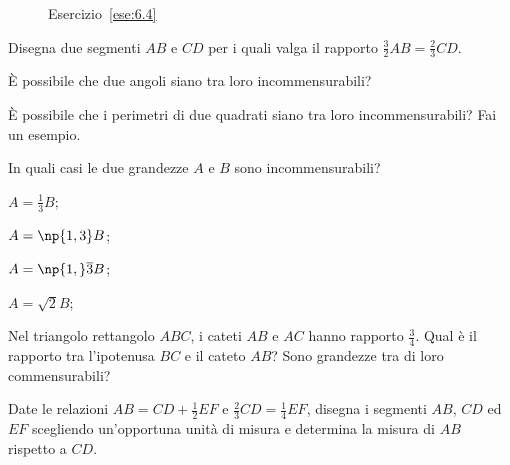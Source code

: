 \begin{inaccessibleblock}
 \begin{figure}[!htb]
	\centering
	\caption{Esercizio~\ref{ese:6.4}}\label{fig:ese6.4}
\end{figure}
\end{inaccessibleblock}

\begin{esercizio}
\label{ese:6.5}
Disegna due segmenti \(AB\) e \(CD\) per i quali valga il rapporto 
\(\frac{3}{2}AB=\frac{2}{3}CD\).
\end{esercizio}

\begin{esercizio}
\label{ese:6.6}
\`E possibile che due angoli siano tra loro incommensurabili?
\end{esercizio}

\begin{esercizio}
\label{ese:6.7}
\`E possibile che i perimetri di due quadrati siano tra loro 
incommensurabili? Fai un esempio.
\end{esercizio}

\begin{esercizio}
\label{ese:6.8}
In quali casi le due grandezze \(A\) e \(B\) sono incommensurabili?
\begin{multicols}{4}
\begin{enumeratea}
\item \(A=\frac{1}{3}B\);
\item \(A=\np{1,3}B\);
\item \(A=\np{1,}\overline{3}B\);
\item \(A=\sqrt{2}B\);
\end{enumeratea}
\end{multicols}
\end{esercizio}

\begin{esercizio}
\label{ese:6.9}
Nel triangolo rettangolo \(ABC\), i cateti \(AB\) e \(AC\) hanno rapporto 
\(\frac{3}{4}\). Qual è il rapporto tra  l'ipotenusa \(BC\) e il cateto 
\(AB\)? Sono grandezze tra di loro commensurabili?
\end{esercizio}

\begin{esercizio}
\label{ese:6.10}
Date le relazioni \(AB=CD+\frac{1}{2}EF\) e 
\(\frac{2}{3}CD=\frac{1}{4}EF\), disegna i segmenti \(AB\), \(CD\) ed \(EF\) 
scegliendo un'opportuna unità di misura e determina la misura di \(AB\) 
rispetto a \(CD\).
\end{esercizio}

